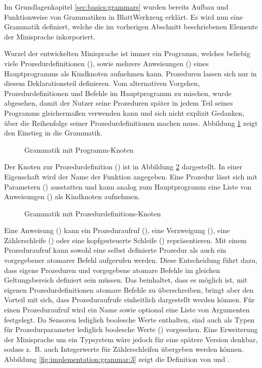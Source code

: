 Im Grundlagenkapitel \ref{sec:basics:grammars} wurden bereits Aufbau und Funktionweise von Grammatiken in BlattWerkzeug erklärt. Es wird nun eine Grammatik definiert, welche die im vorherigen Abschnitt beschriebenen Elemente der Minisprache inkorporiert.

Wurzel der entwickelten Minisprache ist immer ein Programm, welches beliebig viele Prozedurdefinitionen (), sowie mehrere Anweisungen () eines Hauptprogramms als Kindknoten aufnehmen kann. Prozeduren lassen sich nur in diesem Deklarationsteil definieren. Vom alternativen Vorgehen, Prozedurdefinitionen und Befehle im Hauptprogramm zu mischen, wurde abgesehen, damit der Nutzer seine Prozeduren später in jedem Teil seines Programms gleichermaßen verwenden kann und sich nicht explizit Gedanken, über die Reihenfolge seiner Prozedurdefinitionen machen muss. Abbildung \ref{fig:implementation:grammar:1} zeigt den Einstieg in die Grammatik.

\begin{figure}[h]
  
  \caption{Grammatik mit Programm-Knoten}
  \label{fig:implementation:grammar:1}
\end{figure}

Der Knoten zur Prozedurdefinition () ist in Abbildung \ref{fig:implementation:grammar:2} dargestellt. In  einer Eigenschaft wird der Name der Funktion angegeben. Eine Prozedur lässt sich mit Parametern () ausstatten und kann analog zum Hauptprogramm eine Liste von Anweisungen () als Kindknoten aufnehmen.

\begin{figure}[h]
  
  \caption{Grammatik mit Prozedurdefinitions-Knoten}
  \label{fig:implementation:grammar:2}
\end{figure}

Eine Anweisung () kann ein Prozeduraufruf (), eine Verzweigung (), eine Zählerschleife () oder eine kopfgesteuerte Schleife () repräsentieren. Mit einem Prozeduraufruf kann sowohl eine selbst definierte Prozedur als auch ein vorgegebener atomarer Befehl aufgerufen werden. Diese Entscheidung führt dazu, dass eigene Prozeduren und vorgegebene atomare Befehle im gleichen Geltungsbereich definiert sein müssen. Das beinhaltet, dass es möglich ist, mit eigenen Prozedurdefinitionen atomare Befehle zu überschreiben, bringt aber den Vorteil mit sich, dass Prozeduraufrufe einheitlich dargestellt werden können. Für einen Prozeduraufruf wird ein Name sowie optional eine Liste von Argumenten festgelegt. Da Sensoren lediglich boolesche Werte enthalten, sind auch als Typen für Prozedurparameter lediglich boolesche Werte () vorgesehen. Eine Erweiterung der Minisprache um ein Typsystem wäre jedoch für eine spätere Version denkbar, sodass z.~B. auch Integerwerte für Zählerschleifen übergeben werden können. Abbildung \ref{fig:implementation:grammar:3} zeigt die Definition von  und .

